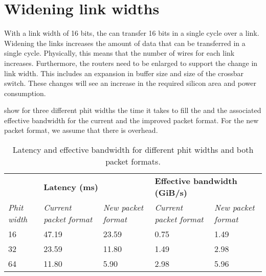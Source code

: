 \section{Widening link widths}
With a link width of 16 bits, the \confignoc{} can transfer 16 bits in a single cycle over a link.
Widening the links increases the amount of data that can be transferred in a single cycle.
Physically, this means that the number of wires for each link increases.
Furthermore, the routers need to be enlarged to support the change in link width.
This includes an expansion in buffer size and size of the crossbar switch. %
These changes will see an increase in the required silicon area and power consumption.

 show for three different phit widths the time it takes to fill the \graicore{} and the associated effective bandwidth for the current and the improved packet format.
For the new packet format, we assume that there is overhead.

\begin{table}[hbtp]
\centering
\begin{adjustbox}{width=\linewidth}
\begin{tabular}{@{}lllll@{}}
\toprule
                    & \multicolumn{2}{l}{\textbf{Latency (ms)}} & \multicolumn{2}{l}{\textbf{Effective bandwidth (GiB/s)}} \\ \cmidrule(lr){2-3} \cmidrule(lr){4-5}
\textit{Phit width} & \textit{Current packet format}    & \textit{New packet format}   & \textit{Current packet format}    & \textit{New packet format}   \\ \midrule
16                  & 47.19                    & 23.59               & 0.75                     & 1.49                \\
32                  & 23.59                    & 11.80               & 1.49                     & 2.98                \\
64                  & 11.80                    & 5.90                & 2.98                     & 5.96                \\ \bottomrule
\end{tabular}
\end{adjustbox}
\caption{Latency and effective bandwidth for different phit widths and both packet formats.}
\label{tab:latency_bandwidth_phit_width_packet_format}
\end{table}

